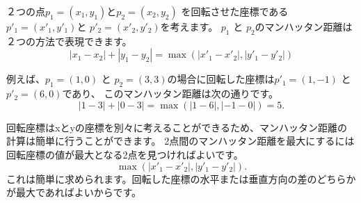 ２つの点$p_1=(x_1,y_1)$と$p_2=(x_2,y_2)$ を回転させた座標である$p'_1=(x'_1,y'_1)$と
$p'_2=(x'_2,y'_2)$を考えます。
$p_1$ と $p_2$のマンハッタン距離は２つの方法で表現できます。
\[|x_1-x_2|+|y_1-y_2| = \max(|x'_1-x'_2|,|y'_1-y'_2|)\]

例えば、$p_1=(1,0)$ と $p_2=(3,3)$の場合に回転した座標は$p'_1=(1,-1)$ と $p'_2=(6,0)$であり、
このマンハッタン距離は次の通りです。
\[|1-3|+|0-3| = \max(|1-6|,|-1-0|) = 5.\]

回転座標はxとyの座標を別々に考えることができるため、マンハッタン距離の計算は簡単に行うことができます。
2点間のマンハッタン距離を最大にするには回転座標の値が最大となる2点を見つければよいです。
\[\max(|x'_1-x'_2|,|y'_1-y'_2|).\]
これは簡単に求められます。回転した座標の水平または垂直方向の差のどちらかが最大であればよいからです。